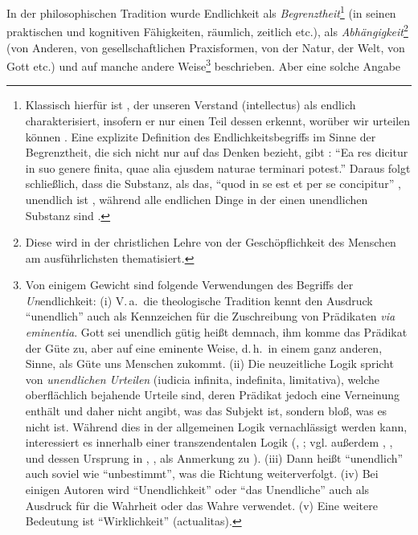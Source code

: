 In der philosophischen Tradition wurde Endlichkeit als
\textit{Begrenztheit}\footnote{Klassisch hierfür ist , der
unseren Verstand (intellectus) als endlich charakterisiert, insofern er nur
einen Teil dessen erkennt, worüber wir urteilen können
\parencite[vgl.][VII:~56.9-58.25]{Descartes:OeuvresdeDescartes1983}. Eine
explizite Definition des Endlichkeitsbegriffs im Sinne der Begrenztheit, die sich nicht
nur auf das Denken bezieht, gibt
\textcite[][\nopp 1d2]{Spinoza:EthikingeometrischerOrdnungdargestellt2007}:
\enquote{Ea res dicitur in suo genere finita, quae alia ejusdem naturae terminari
potest.} Daraus folgt schließlich, dass die Substanz, als das, \enquote{quod in se
est et per se concipitur} \parencite[][\nopp
1d3]{Spinoza:EthikingeometrischerOrdnungdargestellt2007}, unendlich ist
\parencite[vgl.][\nopp 1p8]{Spinoza:EthikingeometrischerOrdnungdargestellt2007},
während alle endlichen Dinge in der einen unendlichen Substanz sind
\parencite[vgl.][\nopp
1p15]{Spinoza:EthikingeometrischerOrdnungdargestellt2007}.} (in seinen
praktischen und kognitiven Fähigkeiten, räumlich, zeitlich etc.), als
\textit{Abhängigkeit}\footnote{Diese wird in der christlichen Lehre von der
Geschöpflichkeit des Menschen am ausführlichsten thematisiert.} (von Anderen,
von gesellschaftlichen Praxisformen, von der Natur, der Welt, von Gott etc.) und
auf manche andere Weise\footnote{Von einigem Gewicht sind folgende
Verwendungen des Begriffs der \emph{Un}endlichkeit: (i) V.\,a.\ die theologische
Tradition kennt den Ausdruck \enquote{unendlich} auch als Kennzeichen für die
Zuschreibung von Prädikaten \emph{via eminentia}. Gott sei unendlich gütig heißt
demnach, ihm komme das Prädikat der Güte zu, aber auf eine eminente Weise,
d.\,h.\ in einem ganz anderen,  Sinne, als Güte uns Menschen
zukommt. (ii) Die neuzeitliche Logik spricht von \emph{unendlichen Urteilen}
(iudicia infinita, indefinita, limitativa), welche oberflächlich bejahende
Urteile sind, deren Prädikat jedoch eine Verneinung enthält und daher nicht
angibt, was das Subjekt ist, sondern bloß, was es nicht ist. Während dies in der
allgemeinen Logik vernachlässigt werden kann, interessiert es innerhalb einer
transzendentalen Logik
\mkbibparens{\cite[vgl.][B~97f.]{Kant:KritikderreinenVernunft2003}, \cite[][III:
88.3--32]{Kant:GesammelteWerke1900ff.}; vgl. außerdem
\cite[][A~160--162]{Kant:ImmanuelKantsLogik1977}, \cite[][IX:
103.23--104.24]{Kant:GesammelteWerke1900ff.}, und dessen Ursprung in %
\cite[][]{Kant:Reflexionen1900ff.}, \cite[][XVI:
639.2--5]{Kant:GesammelteWerke1900ff.}, als Anmerkung zu
\textcite[][\S~294]{Meier:AuszugausderVernunftlehre1752}}. (iii) Dann heißt
\enquote{unendlich} auch soviel wie \enquote{unbestimmt}, was die Richtung weiterverfolgt. (iv) Bei
einigen Autoren wird \enquote{Unendlichkeit} oder \enquote{das Unendliche} auch als
Ausdruck für die Wahrheit oder das Wahre verwendet. (v) Eine weitere Bedeutung
ist \enquote{Wirklichkeit} (actualitas).} beschrieben. Aber eine solche Angabe
